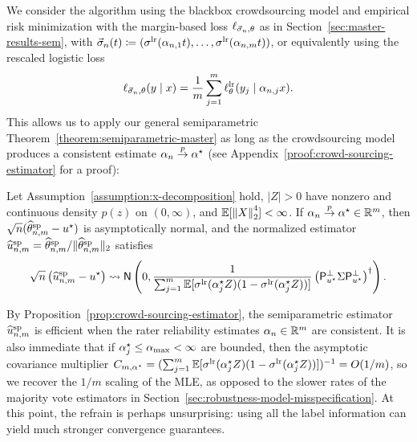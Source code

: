 
We consider the algorithm using the blackbox crowdsourcing model and
empirical risk minimization with the margin-based loss
$\ell_{\vec{\sigma}_n, \theta}$ as in Section~\ref{sec:master-results-sem},
with
$\vec{\sigma}_n(t)
\coloneqq (\sigma^{\textup{lr}}(\alpha_{n,1}t),\dots, \sigma^{\textup{lr}}(\alpha_{n,m}t))$,
or equivalently using the rescaled logistic loss
\begin{align*}
	\ell_{\vec{\sigma}_n, \theta}(y \mid x)
	= \frac{1}{m} \sum_{j=1}^m \ell^{\textup{lr}}_\theta (y_j \mid \alpha_{n,j} x) .
\end{align*}
This allows us to apply our general semiparametric
Theorem~\ref{theorem:semiparametric-master} as long as the crowdsourcing
model produces a consistent estimate $\alpha_n \stackrel{p}{\rightarrow} \alpha^\star$ (see
Appendix~\ref{proof:crowd-sourcing-estimator} for a proof):
\begin{proposition}
	\label{prop:crowd-sourcing-estimator}
	Let Assumption~\ref{assumption:x-decomposition} hold, $|Z| > 0$ have
	nonzero and continuous density $p(z)$ on $(0, \infty)$, and $\mathbb{E}
	[\left\|{X}\right\|_2^4] < \infty$. If $\alpha_n \stackrel{p}{\rightarrow} \alpha^\star \in \mathbb{R}^m$, then
	$\sqrt{n}(\widehat{\theta}^{\textup{sp}}_{n,m} - u^\star)$ is asymptotically normal, and the normalized
	estimator $\widehat{u}^{\textup{sp}}_{n,m} = \widehat{\theta}^{\textup{sp}}_{n,m} / \|{\widehat{\theta}^{\textup{sp}}_{n,m}}\|_2$ satisfies
	\begin{equation*}
		\sqrt{n} \left({\widehat{u}^{\textup{sp}}_{n,m} - u^\star}\right)
		\rightsquigarrow \mathsf{N}\left({0,
			\frac{1}{\sum_{j = 1}^m \mathbb{E}[\sigma^{\textup{lr}}(\alpha_j^\star Z)
				(1 - \sigma^{\textup{lr}}(\alpha_j^\star Z))]}
			\left({\mathsf{P}_{u^\star}^\perp \Sigma \mathsf{P}_{u^\star}^\perp}\right)^\dagger}\right).
	\end{equation*}
\end{proposition}

By Proposition~\ref{prop:crowd-sourcing-estimator}, the semiparametric
estimator $\widehat{u}^{\textup{sp}}_{n,m}$ is efficient when the rater reliability
estimates $\alpha_n \in \mathbb{R}^m$ are consistent.  It is also immediate that if
$\alpha_j^\star \le \alpha_{\max} < \infty$ are bounded, then the asymptotic
covariance multiplier $C_{m,\alpha^\star} = (\sum_{j = 1}^m
\mathbb{E}[\sigma^{\textup{lr}}(\alpha_j^\star Z) (1 - \sigma^{\textup{lr}}(\alpha_j^\star Z))])^{-1} =
O(1/m)$, so we recover the $1/m$ scaling of the MLE, as opposed to the
slower rates of the majority vote estimators in
Section~\ref{sec:robustness-model-misspecification}.  At this point, the
refrain is perhaps unsurprising: using all the label information can yield
much stronger convergence guarantees.
